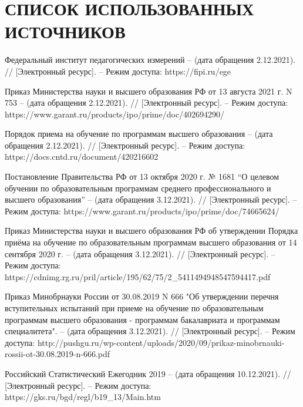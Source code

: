 \section*{СПИСОК ИСПОЛЬЗОВАННЫХ ИСТОЧНИКОВ}

\begingroup
\renewcommand{\section}[2]{}
\begin{thebibliography}{}

	Федеральный институт педагогических измерений – (дата обращения 2.12.2021). // [Электронный ресурс]. – Режим доступа: https://fipi.ru/ege

	Приказ Министерства науки и высшего образования РФ от 13 августа 2021 г. N 753  – (дата обращения 2.12.2021). // [Электронный ресурс]. – Режим доступа: https://www.garant.ru/products/ipo/prime/doc/402694290/

	Порядок приема на обучение по программам высшего образования  – (дата обращения 2.12.2021). // [Электронный ресурс]. – Режим доступа: https://docs.cntd.ru/document/420216602

	Постановление Правительства РФ от 13 октября 2020 г. № 1681 “О целевом обучении по образовательным программам среднего профессионального и высшего образования”  – (дата обращения 3.12.2021). // [Электронный ресурс]. – Режим доступа: https://www.garant.ru/products/ipo/prime/doc/74665624/

	Приказ Министерства науки и высшего образования РФ об утверждении Порядка приёма на обучение по образовательным программам высшего образования от 14 сентября 2020 г. – (дата обращения 3.12.2021). // [Электронный ресурс]. – Режим доступа: https://cdnimg.rg.ru/pril/article/195/62/75/2_5411494948547594417.pdf

	Приказ Минобрнауки России от 30.08.2019 N 666 "Об утверждении перечня вступительных испытаний при приеме на обучение по образовательным программам высшего образования - программам бакалавриата и программам специалитета". – (дата обращения 3.12.2021). // [Электронный ресурс]. – Режим доступа: http://pushgu.ru/wp-content/uploads/2020/09/prikaz-minobrnauki-rossii-ot-30.08.2019-n-666.pdf

	Российский Статистический Ежегодник 2019 – (дата обращения 10.12.2021). // [Электронный ресурс]. – Режим доступа: https://gks.ru/bgd/regl/b19\_13/Main.htm


\end{thebibliography}

